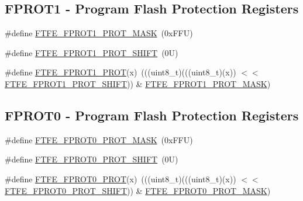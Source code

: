 \subsection*{F\+P\+R\+O\+T1 -\/ Program Flash Protection Registers}
\begin{DoxyCompactItemize}
\item 
\#define \mbox{\hyperlink{group___f_t_f_e___register___masks_ga1e6a0ea36b9fdb8f847e4a750172e45a}{F\+T\+F\+E\+\_\+\+F\+P\+R\+O\+T1\+\_\+\+P\+R\+O\+T\+\_\+\+M\+A\+SK}}~(0x\+F\+F\+U)
\item 
\#define \mbox{\hyperlink{group___f_t_f_e___register___masks_ga0b97e40cb2ae6312e945abee0e35ad75}{F\+T\+F\+E\+\_\+\+F\+P\+R\+O\+T1\+\_\+\+P\+R\+O\+T\+\_\+\+S\+H\+I\+FT}}~(0\+U)
\item 
\#define \mbox{\hyperlink{group___f_t_f_e___register___masks_ga0125c948b5a0d9a057225d1bd2d08967}{F\+T\+F\+E\+\_\+\+F\+P\+R\+O\+T1\+\_\+\+P\+R\+OT}}(x)~(((uint8\+\_\+t)(((uint8\+\_\+t)(x)) $<$$<$ \mbox{\hyperlink{group___f_t_f_e___register___masks_ga0b97e40cb2ae6312e945abee0e35ad75}{F\+T\+F\+E\+\_\+\+F\+P\+R\+O\+T1\+\_\+\+P\+R\+O\+T\+\_\+\+S\+H\+I\+FT}})) \& \mbox{\hyperlink{group___f_t_f_e___register___masks_ga1e6a0ea36b9fdb8f847e4a750172e45a}{F\+T\+F\+E\+\_\+\+F\+P\+R\+O\+T1\+\_\+\+P\+R\+O\+T\+\_\+\+M\+A\+SK}})
\end{DoxyCompactItemize}
\subsection*{F\+P\+R\+O\+T0 -\/ Program Flash Protection Registers}
\begin{DoxyCompactItemize}
\item 
\#define \mbox{\hyperlink{group___f_t_f_e___register___masks_gadeb846e611d1e77100baf8db858ae32c}{F\+T\+F\+E\+\_\+\+F\+P\+R\+O\+T0\+\_\+\+P\+R\+O\+T\+\_\+\+M\+A\+SK}}~(0x\+F\+F\+U)
\item 
\#define \mbox{\hyperlink{group___f_t_f_e___register___masks_gab968ce0cba033b854ff5ae5a5fbe2f34}{F\+T\+F\+E\+\_\+\+F\+P\+R\+O\+T0\+\_\+\+P\+R\+O\+T\+\_\+\+S\+H\+I\+FT}}~(0\+U)
\item 
\#define \mbox{\hyperlink{group___f_t_f_e___register___masks_ga70a43ff9a877173f40765cb1f334567e}{F\+T\+F\+E\+\_\+\+F\+P\+R\+O\+T0\+\_\+\+P\+R\+OT}}(x)~(((uint8\+\_\+t)(((uint8\+\_\+t)(x)) $<$$<$ \mbox{\hyperlink{group___f_t_f_e___register___masks_gab968ce0cba033b854ff5ae5a5fbe2f34}{F\+T\+F\+E\+\_\+\+F\+P\+R\+O\+T0\+\_\+\+P\+R\+O\+T\+\_\+\+S\+H\+I\+FT}})) \& \mbox{\hyperlink{group___f_t_f_e___register___masks_gadeb846e611d1e77100baf8db858ae32c}{F\+T\+F\+E\+\_\+\+F\+P\+R\+O\+T0\+\_\+\+P\+R\+O\+T\+\_\+\+M\+A\+SK}})
\end{DoxyCompactItemize}
